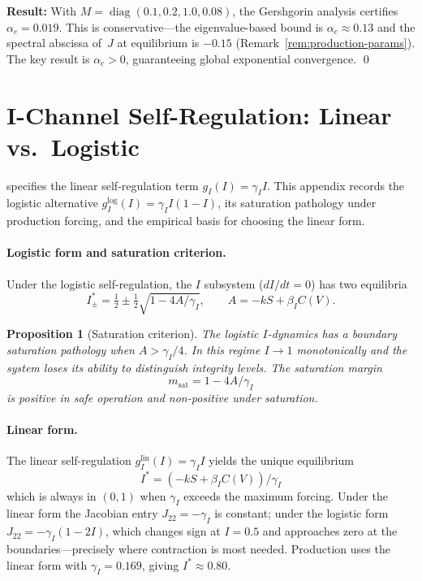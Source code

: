 \documentclass[11pt,twocolumn]{article}
\newtheorem{proposition}[theorem]{Proposition}
\begin{document}
\medskip
\textbf{Result:} With $M = \operatorname{diag}(0.1, 0.2, 1.0,
0.08)$, the Gershgorin analysis certifies $\alpha_c = 0.019$.
This is conservative---the eigenvalue-based bound is
$\alpha_c \approx 0.13$ and the spectral abscissa of~$J$ at
equilibrium is $-0.15$
(Remark~\ref{rem:production-params}). The key result is
$\alpha_c > 0$, guaranteeing global exponential
convergence. \qed


\section{I-Channel Self-Regulation: Linear vs.\ Logistic}
\label{app:saturation}

 specifies the linear self-regulation term
$g_I(I) = \gamma_I I$. This appendix records the logistic
alternative $g_I^{\log}(I) = \gamma_I I(1-I)$, its saturation
pathology under production forcing, and the empirical basis for
choosing the linear form.

\paragraph{Logistic form and saturation criterion.}
Under the logistic self-regulation, the $I$ subsystem
($dI/dt = 0$) has two equilibria
\begin{equation}
  I^*_{\pm} = \tfrac{1}{2} \pm \tfrac{1}{2}\sqrt{1 - 4A/\gamma_I},
  \qquad A = -kS + \beta_I C(V).
  \label{eq:I-equilibria}
\end{equation}

\begin{proposition}[Saturation criterion]
\label{prop:saturation}
The logistic $I$-dynamics has a boundary saturation pathology
when $A > \gamma_I/4$. In this regime $I \to 1$ monotonically and
the system loses its ability to distinguish integrity levels. The
saturation margin
\begin{equation}
  m_{\text{sat}} = 1 - 4A/\gamma_I
  \label{eq:saturation-margin}
\end{equation}
is positive in safe operation and non-positive under saturation.
\end{proposition}

\paragraph{Linear form.}
The linear self-regulation $g_I^{\text{lin}}(I) = \gamma_I I$
yields the unique equilibrium
\begin{equation}
  I^* = (-kS + \beta_I C(V)) / \gamma_I
  \label{eq:I-star-linear}
\end{equation}
which is always in $(0,1)$ when $\gamma_I$ exceeds the maximum
forcing. Under the linear form the Jacobian entry
$J_{22} = -\gamma_I$ is constant; under the logistic form
$J_{22} = -\gamma_I(1 - 2I)$, which changes sign at $I = 0.5$ and
approaches zero at the boundaries---precisely where contraction
is most needed. Production uses the linear form with
$\gamma_I = 0.169$, giving $I^* \approx 0.80$.
\end{document}
